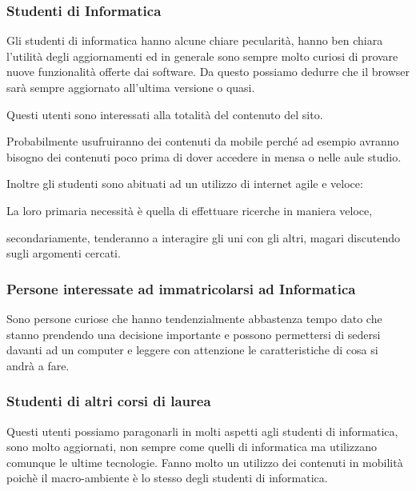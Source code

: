 \subsubsection{Studenti di Informatica}

Gli studenti di informatica hanno alcune chiare pecularità, hanno ben chiara l'utilità degli aggiornamenti ed in generale sono sempre molto curiosi di provare nuove funzionalità offerte dai software. Da questo possiamo dedurre che il browser sarà sempre aggiornato all'ultima versione o quasi.

Questi utenti sono interessati alla totalità del contenuto del sito.

Probabilmente usufruiranno dei contenuti da mobile perché ad esempio avranno bisogno dei contenuti poco prima di dover accedere in mensa o nelle aule studio.

Inoltre gli studenti sono abituati ad un utilizzo di internet agile e veloce:

La loro primaria necessità è quella di effettuare ricerche in maniera veloce, 

secondariamente, tenderanno a interagire gli uni con gli altri, magari discutendo sugli argomenti cercati.


\subsubsection{Persone interessate ad immatricolarsi ad Informatica}
Sono persone curiose che hanno tendenzialmente abbastenza tempo dato che stanno prendendo una decisione importante e possono permettersi di sedersi davanti ad un computer e leggere con attenzione le caratteristiche di cosa si andrà a fare.


\subsubsection{Studenti di altri corsi di laurea}
Questi utenti possiamo paragonarli in molti aspetti agli studenti di informatica, sono molto aggiornati, non sempre come quelli di informatica ma utilizzano comunque le ultime tecnologie. Fanno molto un utilizzo dei contenuti in mobilità poichè il macro-ambiente è lo stesso degli studenti di informatica.

